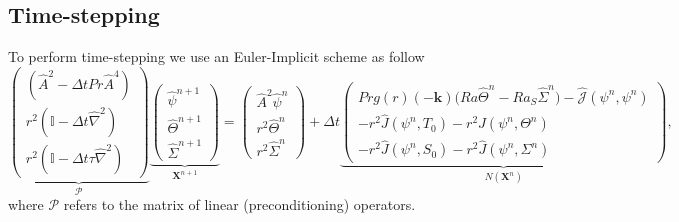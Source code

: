 \documentclass[a4paper]{article}
\newcommand{\Pran}{Pr}
\begin{document}
\subsection{Time-stepping}

To perform time-stepping we use an Euler-Implicit scheme as follow
\begin{equation}
\underbrace{\begin{pmatrix}
(\hat{A}^2 - \Delta t \Pran \hat{A}^4) \\
r^2 ( \mathbb{I} - \Delta t \hat{\nabla}^2) \\
r^2 ( \mathbb{I} - \Delta t \tau \hat{\nabla}^2)
\end{pmatrix} }_{ \mathcal{P} } 
\underbrace{\begin{pmatrix}
\hat{\psi}^{n+1} \\
\hat{\Theta}^{n+1} \\
\hat{\Sigma}^{n+1} 
\end{pmatrix}}_{ \boldsymbol{X}^{n+1} } 
=
\begin{pmatrix}
\hat{A}^2 \hat{\psi}^n  \\
r^2 \hat{\Theta}^{n} \\
r^2 \hat{\Sigma}^{n}
\end{pmatrix}
+ \Delta t 
\underbrace{
\begin{pmatrix} 
\Pran g(r) (-\boldsymbol{k}) \big ( Ra \hat{\Theta}^n - Ra_S \hat{\Sigma}^n ) - \hat{\mathcal{J}}( \psi^n,\psi^n) \\
- r^2 \hat{J}(\psi^n,T_0) - r^2 \hat{J}(\psi^n,\Theta^n) \\
- r^2 \hat{J}(\psi^n,S_0) - r^2 \hat{J}(\psi^n,\Sigma^n)
\end{pmatrix}
}_{N(\boldsymbol{X}^n)},
\label{eq:timeStep}
\end{equation}
where $\mathcal{P}$ refers to the matrix of linear (preconditioning) operators. %
\end{document}
